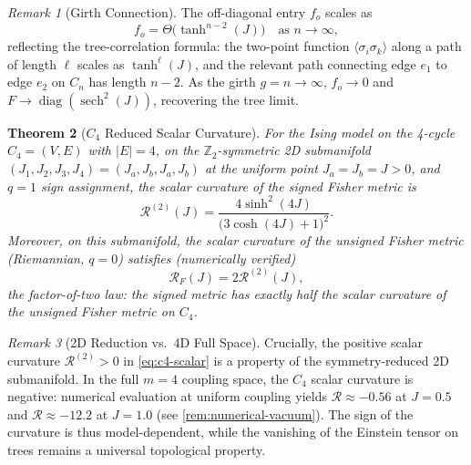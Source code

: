 \documentclass[11pt]{article}
\newtheorem{theorem}{Theorem}[section]
\theoremstyle{definition}
\theoremstyle{remark}
\newtheorem{remark}[theorem]{Remark}
\newcommand{\Fish}{F}
\newcommand{\diag}{\operatorname{diag}}
\newcommand{\sech}{\operatorname{sech}}
\newcommand{\Scal}{\mathcal{R}}
\begin{document}
\begin{remark}[Girth Connection]
The off-diagonal entry $f_o$ scales as
\begin{equation}
  f_o = \Theta\bigl(\tanh^{n-2}(J)\bigr) \quad \text{as } n \to \infty,
  \label{eq:fo-scaling}
\end{equation}
reflecting the tree-correlation formula: the two-point function
$\langle \sigma_i \sigma_k \rangle$ along a path of length $\ell$ scales
as $\tanh^\ell(J)$, and the relevant path connecting edge $e_1$ to
edge $e_2$ on $C_n$ has length $n - 2$. As the girth $g = n \to \infty$,
$f_o \to 0$ and $\Fish \to \diag(\sech^2(J))$, recovering the tree limit.
\end{remark}

\begin{theorem}[$C_4$ Reduced Scalar Curvature]
\label{thm:c4-exact}
For the Ising model on the 4-cycle $C_4 = (V, E)$ with $|E| = 4$,
on the $\mathbb{Z}_2$-symmetric 2D submanifold $(J_1, J_2, J_3, J_4) = (J_a, J_b, J_a, J_b)$
at the uniform point $J_a = J_b = J > 0$, and $q = 1$ sign assignment,
the scalar curvature of the signed Fisher metric is
\begin{equation}
  \boxed{\Scal^{(2)}(J) = \frac{4\sinh^2(4J)}{\bigl(3\cosh(4J) + 1\bigr)^2}.}
  \label{eq:c4-scalar}
\end{equation}
Moreover, on this submanifold, the scalar curvature of the unsigned Fisher
metric (Riemannian, $q = 0$) satisfies (numerically verified)
\begin{equation}
  \Scal_{\Fish}(J) = 2 \Scal^{(2)}(J),
  \label{eq:factor-two-law}
\end{equation}
the \emph{factor-of-two law}: the signed metric has exactly half the
scalar curvature of the unsigned Fisher metric on $C_4$.
\end{theorem}

\begin{remark}[2D Reduction vs.\ 4D Full Space]
\label{rem:c4-reduction}
Crucially, the positive scalar curvature $\Scal^{(2)} > 0$ in \eqref{eq:c4-scalar} is
a property of the symmetry-reduced 2D submanifold. In the full $m=4$
coupling space, the $C_4$ scalar curvature is negative: numerical evaluation
at uniform coupling yields $\Scal \approx -0.56$ at $J=0.5$ and
$\Scal \approx -12.2$ at $J=1.0$ (see \cref{rem:numerical-vacuum}).
The sign of the curvature is thus model-dependent, while the vanishing of
the Einstein tensor on trees remains a universal topological property.
\end{remark}
\end{document}
